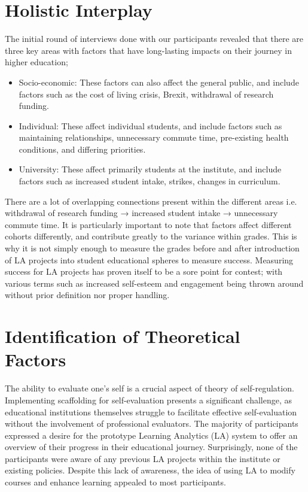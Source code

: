 \documentclass{l4proj}
\begin{document}
\section{Holistic Interplay}
The initial round of interviews done with our participants revealed that there are three key areas with factors that have long-lasting impacts on their journey in higher education; 
\begin{itemize}
    \item  Socio-economic: These factors can also affect the general public, and include factors such as the cost of living crisis, Brexit, withdrawal of research funding.
    \item Individual: These affect individual students, and include factors such as  maintaining relationships, unnecessary commute time, pre-existing health conditions, and differing priorities.
    \item University: These affect primarily students at the institute, and include factors such as increased student intake, strikes, changes in curriculum.
\end{itemize}
There are a lot of overlapping connections present within the different areas i.e. withdrawal of research funding → increased student intake → unnecessary commute time. It is particularly important to note that factors affect different cohorts differently, and contribute greatly to the variance within grades. This is why it is not simply enough to measure the grades before and after introduction of LA projects into student educational spheres to measure success. Measuring success for LA projects has proven itself to be a sore point for contest; with various terms such as increased self-esteem and engagement being thrown around without prior definition nor proper handling.

\section{Identification of Theoretical Factors}


The ability to evaluate one's self is a crucial aspect of \citet{zimmerman2009self} theory of self-regulation. Implementing scaffolding for self-evaluation presents a significant challenge, as educational institutions themselves struggle to facilitate effective self-evaluation without the involvement of professional evaluators\citep{mcnamara2008importance}. The majority of participants expressed a desire for the prototype Learning Analytics (LA) system to offer an overview of their progress in their educational journey. Surprisingly, none of the participants were aware of any previous LA projects within the institute or existing policies. Despite this lack of awareness, the idea of using LA to modify courses and enhance learning appealed to most participants. 
\end{document}
